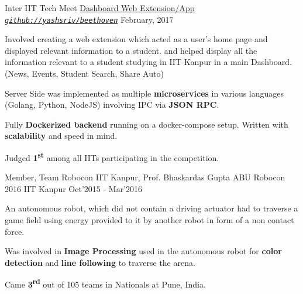 
\begin{cventries}

  \cventry
  {Inter IIT Tech Meet}
  {\href{https://github.com/yashsriv/beethoven}{Dashboard Web Extension/App}}
  {\emph{\texttt{\href{https://github.com/yashsriv/beethoven}{github://yashsriv/beethoven}}}}
  {February, 2017}
  {
    \begin{cvitems}
    \item Involved creating a web extension which acted as a user’s home page
      \ifdefined \ONEPAGE and displayed relevant information to a student. \else
      and helped display all the information relevant to a student studying in
      IIT Kanpur in a main Dashboard. (News, Events, Student Search, Share Auto)
      \fi
    \item Server Side was implemented as multiple \textbf{microservices} in
      various languages \ifdefined \ONEPAGE \else (Golang, Python, NodeJS) \fi
      involving IPC via \textbf{JSON RPC}.
    \item Fully \textbf{Dockerized backend} running on a docker-compose setup.
      Written with \textbf{scalability} and speed in mind.
    \item Judged \textbf{1\textsuperscript{st}} among all IITs participating
      in the competition.
    \end{cvitems}
  }

  \cventry
  {Member, Team Robocon IIT Kanpur\ifdefined\ONEPAGE\else, Prof. Bhaskardas Gupta\fi}
  {ABU Robocon 2016}
  {IIT Kanpur}
  {Oct'2015 - Mar'2016}
  {
    \begin{cvitems}
      \item An autonomous robot, which did not contain a driving actuator had to
        traverse a game field using energy provided to it by another robot in
        form of a non contact force.
      \item Was involved in \textbf{Image Processing} used in the autonomous
        robot for \textbf{color detection} and \textbf{line following}
        \ifdefined \ONEPAGE \else to traverse the arena. \fi
      \item Came \textbf{3\textsuperscript{rd}} out of 105 teams in Nationals at Pune, India.
    \end{cvitems}
  }


\end{cventries}
